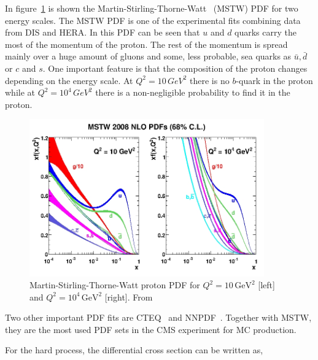 In figure~\ref{fig:MSTW} is shown the Martin-Stirling-Thorne-Watt~\cite{Martin:2009iq} (MSTW) PDF for two energy scales. The MSTW PDF is one of the experimental fits combining data from DIS and HERA. In this PDF can be seen that $u$ and $d$ quarks carry the most of the momentum of the proton. The rest of the momentum is spread mainly over a huge amount of gluons and some, less probable, sea quarks as $\bar{u}, \bar{d}$ or $c$ and $s$. One important feature is that the composition of the proton changes depending on the energy scale. At $Q^{2}= 10\, GeV^{2}$ there is no $b$-quark in the proton while at $Q^{2}= 10^{4}\, GeV^{2}$ there is a non-negligible probability to find it in the proton.

\begin{figure}[!Hhtbp]
  \begin{center}
    \includegraphics[width=0.9\textwidth]{figs/mstw2008nlo68cl_allpdfs.jpg}
    \caption{Martin-Stirling-Thorne-Watt proton PDF for $Q^{2}= 10\, \text{GeV}^{2}$ [left] and $Q^{2}= 10^{4}\, \text{GeV}^{2}$ [right]. From~\cite{Martin:2009iq}}
    \label{fig:MSTW}
  \end{center}
\end{figure}

Two other important PDF fits are CTEQ~\cite{Nadolsky:2008zw} and NNPDF~\cite{Ball:2010de}. Together with MSTW, they are the most used PDF sets in the CMS experiment for MC production. 

For the hard process, the differential cross section can be written as,

